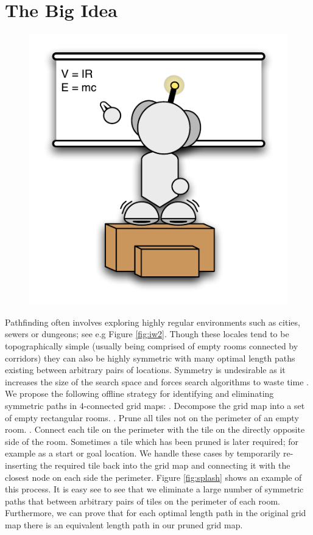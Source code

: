 \section{The Big Idea}
 \begin{figure}
	\vspace{-3.5em}
		\includegraphics[width=0.25\columnwidth, trim=10mm 10mm 10mm 10mm]{diagrams/robot_whiteboard.pdf}
 	\vspace{-2em}
 \end{figure}
Pathfinding often involves exploring highly regular 
environments such as cities, sewers or dungeons; see e.g Figure \ref{fig:iw2}.
Though these locales tend to be topographically simple (usually being comprised
of empty rooms connected by corridors) they can also be highly symmetric 
with many optimal length paths existing between arbitrary pairs of locations.
Symmetry is undesirable as it increases the size of the search space and forces
search algorithms to waste time \cite{walsh07}.
\newline \newline
We propose the following offline strategy for identifying and eliminating symmetric paths in 
4-connected grid maps:
\newline {}. Decompose the grid map into a set of empty rectangular rooms.
. Prune all tiles not on the perimeter of an empty room.
. Connect each tile on the perimeter with the tile on the directly opposite side of the room.
\newline \newline
Sometimes a tile which has been pruned is later required; for example as a start
or goal location. 
We handle these cases by temporarily re-inserting the required tile back into
the grid map and connecting it with the closest node on each side the perimeter.
\newline \newline
Figure \ref{fig:splash} shows an example of this process.
It is easy see to see that we eliminate a large number of symmetric paths
that between arbitrary pairs of tiles on the perimeter of each room. 
Furthermore, we can prove that for each optimal length path in the
original grid map there is an equivalent length path in our pruned grid map.
